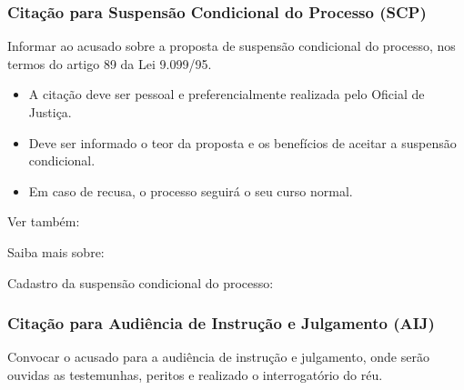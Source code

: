 \documentclass[letterpaper,10pt,brazil]{sphinxmanual}
\begin{document}
\subsubsection{Citação para Suspensão Condicional do Processo (SCP)}
\label{\detokenize{06atosintimatorios:citacao-para-suspensao-condicional-do-processo-scp}}
\sphinxAtStartPar
{}

\sphinxAtStartPar
Informar ao acusado sobre a proposta de suspensão condicional do processo, nos termos do artigo 89 da Lei 9.099/95.

\sphinxAtStartPar
{}
\begin{itemize}
\item {} 
\sphinxAtStartPar
A citação deve ser pessoal e preferencialmente realizada pelo Oficial de Justiça.

\item {} 
\sphinxAtStartPar
Deve ser informado o teor da proposta e os benefícios de aceitar a suspensão condicional.

\item {} 
\sphinxAtStartPar
Em caso de recusa, o processo seguirá o seu curso normal.

\end{itemize}


\begin{sphinxseealso}{Ver também:}

\sphinxAtStartPar
Saiba mais sobre:

\sphinxAtStartPar
Cadastro da suspensão condicional do processo: {\hyperref[\detokenize{projud_55_cadastrosuspensao::doc}]{}}


\end{sphinxseealso}



\subsubsection{Citação para Audiência de Instrução e Julgamento (AIJ)}
\label{\detokenize{06atosintimatorios:citacao-para-audiencia-de-instrucao-e-julgamento-aij}}
\sphinxAtStartPar
{}

\sphinxAtStartPar
Convocar o acusado para a audiência de instrução e julgamento, onde serão ouvidas as testemunhas, peritos e realizado o interrogatório do réu.
\end{document}
